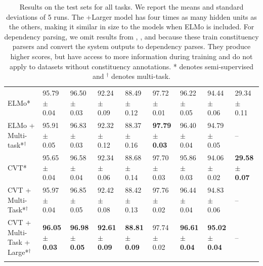 \documentclass[11pt,a4paper]{article}
\newcommand\Bstrut{\rule[-1.0ex]{0pt}{0pt}}   %
\newcommand{\thickline}{\Xhline{2.5\arrayrulewidth}}
\newcommand{\tbottom}{\Bstrut \\ \thickline}
\begin{document}
\begin{table}[b!]
{\begin{tabular}{l | l l l l l | l l | l }
ELMo* & 95.79 $\pm$ 0.04 & 96.50 $\pm$ 0.03 & 92.24 $\pm$ 0.09 & 88.49 $\pm$ 0.12 & 97.72 $\pm$ 0.01 & 96.22 $\pm$ 0.05 & 94.44 $\pm$ 0.06 & 29.34 $\pm$ 0.11 \\
ELMo + Multi-task*$^\dagger$ & 95.91 $\pm$ 0.05 & 96.83 $\pm$ 0.03 & 92.32 $\pm$ 0.12 & 88.37 $\pm$ 0.16 & \textbf{97.79 $\pm$ 0.03} & 96.40 $\pm$ 0.04 & 94.79 $\pm$ 0.05 & -- \\
CVT* & 95.65 $\pm$ 0.04 & 96.58 $\pm$ 0.04 & 92.34 $\pm$ 0.06 & 88.68 $\pm$ 0.14 & 97.70 $\pm$ 0.03 & 95.86 $\pm$ 0.03 & 94.06 $\pm$ 0.02 & \textbf{29.58 $\pm$ 0.07}   \\
CVT + Multi-Task*$^\dagger$ & 95.97 $\pm$ 0.04 &  96.85 $\pm$ 0.05 &  92.42 $\pm$ 0.08 & 88.42 $\pm$ 0.13 & 97.76 $\pm$ 0.02 &  96.44 $\pm$ 0.04 &  94.83 $\pm$ 0.06 & -- \\
CVT + Multi-Task + Large*$^\dagger$ & \textbf{96.05 $\pm$ 0.03} &  \textbf{96.98 $\pm$ 0.05} &  \textbf{92.61 $\pm$ 0.09} & \textbf{88.81 $\pm$ 0.09} & 97.74 $\pm$ 0.02 &  \textbf{96.61 $\pm$ 0.04} &  \textbf{95.02 $\pm$ 0.04} & -- 
\tbottom
\end{tabular}
}
\vspace{0mm} \\ 
\caption{Results on the test sets for all tasks. We report the means and standard deviations of 5 runs. 
The +Larger model has four times as many hidden units as the others, making it similar in size to the models when ELMo is included. 
For dependency parsing, we omit results from \citet{choe2016parsing}, \citet{kuncoro2017what}, and \citet{Liu2017in} because these train constituency parsers and convert the system outputs to dependency parses. They produce higher scores, but have access to more information during training and do not apply to datasets without constituency annotations. * denotes semi-supervised and $^\dagger$ denotes multi-task.}
\vspace{-1mm}
\label{tab:detailed-nlp}
\end{table}
\addtolength{\tabcolsep}{1pt}
\end{document}
